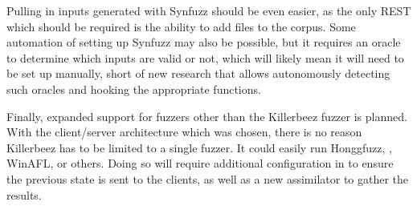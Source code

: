 Pulling in inputs generated with Synfuzz should be even easier, as the only
REST \API{} which should be required is the ability to add files to the corpus.
Some automation of setting up Synfuzz may also be possible, but it requires an
oracle to determine which inputs are valid or not, which will likely mean it
will need to be set up manually, short of new research that allows
autonomously detecting such oracles and hooking the appropriate functions.

Finally, expanded support for fuzzers other than the Killerbeez fuzzer is planned. With
the client/server architecture which was chosen, there is no reason Killerbeez
has to be limited to a single fuzzer.  It could easily run Honggfuzz,
\AFL{}, WinAFL, or others.  Doing so will require additional configuration in
\BOINC{} to ensure the previous state is sent to the \BOINC{} clients, as well
as a new \BOINC{} assimilator to gather the results.







